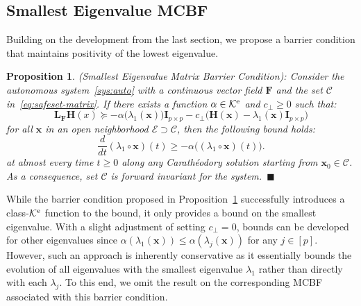 \documentclass[10pt,twocolumn,twoside]{IEEEtran}
\newcommand{\until}[1]{[#1]}
\newcommand{\longthmtitle}[1]{\mbox{}{\textit{(#1):}}}
\newcommand{\Cc}{\mathcal{C}}
\newcommand{\Ec}{\mathcal{E}}
\newcommand{\Kc}{\mathcal{K}}
\newcommand{\Ke}{\Kc^{\rm e}}
\newtheorem{proposition}{Proposition}
\theoremstyle{definition}
\newcommand{\bx}{\mathbf{x}}
\newcommand{\bF}{\mathbf{F}}
\newcommand{\bH}{\mathbf{H}}
\newcommand{\bI}{\mathbf{I}}
\newcommand{\bL}{\mathbf{L}}
\begin{document}
\subsection{Smallest Eigenvalue MCBF}
Building on the development from the last section, we propose a barrier condition that maintains positivity of the lowest eigenvalue.
\begin{proposition}\longthmtitle{Smallest Eigenvalue Matrix Barrier Condition}
    \label{prop:BC-smallest}
    Consider the autonomous system~\eqref{sys:auto} with a continuous vector field $\bF$  and the set $\Cc$ in~\eqref{eq:safeset-matrix}. If there exists a function $\alpha\in\Ke$ and $c_\perp \geq 0$ such that:
    \begin{equation}\label{eq:BC-smallest}
        \bL_\bF\bH(x) \succeq -\alpha\big(
        \lambda_1(\bx)
        \big)\bI_{p\times p}-c_\perp\big(
        \bH(\bx)-\lambda_1(\bx)\bI_{p\times p}
        \big)
    \end{equation}
    for all $\bx$ in an open neighborhood $\Ec\supset\Cc$, then the following bound holds:
    \begin{equation}\label{eq:eig-bound-smallest}
        \frac{d}{dt}(\lambda_1\circ \bx)(t) \geq -\alpha\big(
        (\lambda_1\circ\bx)(t)
        \big).
    \end{equation}
    at almost every time $t\geq0$ along any Carath\'eodory solution starting from $\bx_0\in\Cc$. As a consequence, set $\Cc$ is forward invariant for the system.~\hfill$\blacksquare$
\end{proposition}
While the barrier condition proposed in Proposition~\ref{prop:BC-smallest} successfully introduces a class-$\Ke$ function to the bound, it only provides a bound on the smallest eigenvalue. With a slight adjustment of setting $c_\perp=0$, bounds can be developed for other eigenvalues since $\alpha(\lambda_1(\bx))\leq \alpha(\lambda_j(\bx))$ for any $j\in\until{p}$. However, such an approach is inherently conservative as it essentially bounds the evolution of all eigenvalues with the smallest eigenvalue $\lambda_1$ rather than directly with each $\lambda_j$. To this end, we omit the result on the corresponding MCBF associated with this barrier condition.
\end{document}

